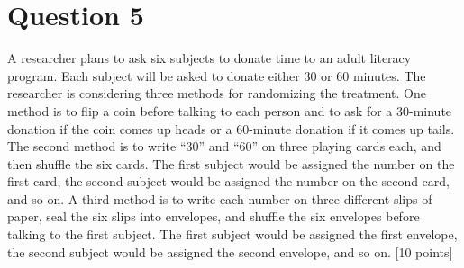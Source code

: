 \documentclass[11pt,notitlepage]{article}		%
\begin{document}
\section*{Question 5}
A researcher plans to ask six subjects to donate time to an adult literacy program. Each subject will be asked to donate either 30 or 60 minutes.  The researcher is considering three methods for randomizing the treatment.  One method is to flip a coin before talking to each person and to ask for a 30-minute donation if the coin comes up heads or a 60-minute donation if it comes up tails. The second method is to write ``30'' and ``60'' on three playing cards each, and then shuffle the six cards. The first subject would be assigned the number on the first card, the second subject would be assigned the number on the second card, and so on.  A third method is to write each number on three different slips of paper, seal the six slips into envelopes, and shuffle the six envelopes before talking to the first subject.  The first subject would be assigned the first envelope, the second subject would be assigned the second envelope, and so on. [10 points]
\end{document}
